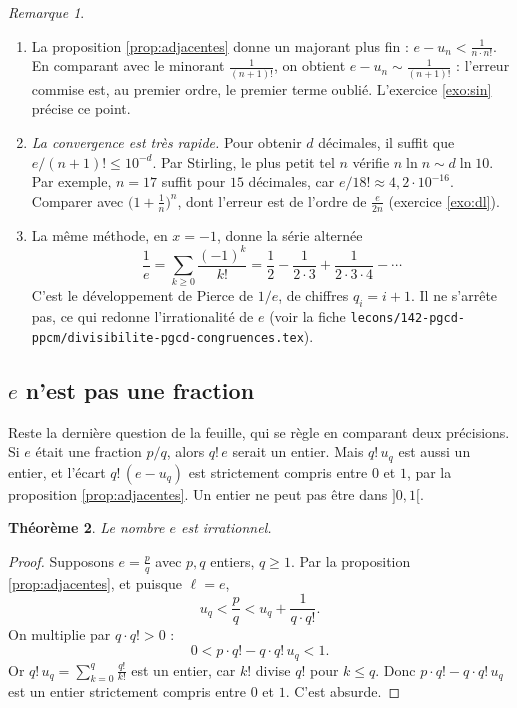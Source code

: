 \documentclass[11pt,a4paper]{article}
\theoremstyle{plain}
\newtheorem{theoreme}{Théorème}[section]
\theoremstyle{definition}
\theoremstyle{remark}
\newtheorem{remarque}[theoreme]{Remarque}
\begin{document}
\begin{remarque}
\begin{enumerate}[nosep]
\item La proposition \ref{prop:adjacentes} donne un majorant plus fin : $e-u_n<\frac1{n\cdot n!}$. En comparant avec le minorant $\frac1{(n+1)!}$, on obtient $e-u_n\sim\frac1{(n+1)!}$ : l'erreur commise est, au premier ordre, le premier terme oublié. L'exercice \ref{exo:sin} précise ce point.
\item \emph{La convergence est très rapide.} Pour obtenir $d$ décimales, il suffit que $e/(n+1)!\leq10^{-d}$. Par Stirling, le plus petit tel $n$ vérifie $n\ln n\sim d\ln10$. Par exemple, $n=17$ suffit pour $15$ décimales, car $e/18!\approx4{,}2\cdot10^{-16}$. Comparer avec $\big(1+\frac1n\big)^n$, dont l'erreur est de l'ordre de $\frac e{2n}$ (exercice \ref{exo:dl}).
\item La même méthode, en $x=-1$, donne la série alternée
\[
  \frac1e=\sum_{k\geq0}\frac{(-1)^k}{k!}=\frac12-\frac1{2\cdot3}+\frac1{2\cdot3\cdot4}-\cdots
\]
C'est le développement de Pierce de $1/e$, de chiffres $q_i=i+1$. Il ne s'arrête pas, ce qui redonne l'irrationalité de $e$ (voir la fiche \texttt{lecons/142-pgcd-ppcm/divisibilite-pgcd-congruences.tex}).
\end{enumerate}
\end{remarque}

\subsection{\texorpdfstring{$e$}{e} n'est pas une fraction}

Reste la dernière question de la feuille, qui se règle en comparant deux précisions. Si $e$ était une fraction $p/q$, alors $q!\,e$ serait un entier. Mais $q!\,u_q$ est aussi un entier, et l'écart $q!\,(e-u_q)$ est strictement compris entre $0$ et $1$, par la proposition \ref{prop:adjacentes}. Un entier ne peut pas être dans $]0,1[$.

\begin{theoreme}\label{thm:irr}
Le nombre $e$ est irrationnel.
\end{theoreme}

\begin{proof}
Supposons $e=\frac pq$ avec $p,q$ entiers, $q\geq1$. Par la proposition \ref{prop:adjacentes}, et puisque $\ell=e$,
\[
  u_q<\frac pq<u_q+\frac1{q\cdot q!} .
\]
On multiplie par $q\cdot q!>0$ :
\[
  0<p\cdot q!-q\cdot q!\,u_q<1 .
\]
Or $q!\,u_q=\sum_{k=0}^q\frac{q!}{k!}$ est un entier, car $k!$ divise $q!$ pour $k\leq q$. Donc $p\cdot q!-q\cdot q!\,u_q$ est un entier strictement compris entre $0$ et $1$. C'est absurde.
\end{proof}
\end{document}
